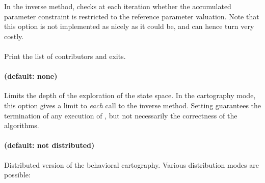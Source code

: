 In the inverse method, checks at each iteration whether the accumulated parameter constraint is restricted to the reference parameter valuation.
Note that this option is not implemented as nicely as it could be, and can hence turn very costly.


% 


\paragraph{}
Print the list of contributors and exits.


\paragraph{ (default: none)}
Limits the depth of the exploration of the state space.
In the cartography mode, this option gives a limit to \emph{each} call to the inverse method.
Setting  guarantees the termination of any execution of \imitator{}, but not necessarily the correctness of the algorithms.


\paragraph{ (default: not distributed)}
Distributed version of the behavioral cartography.
Various distribution modes are possible:

